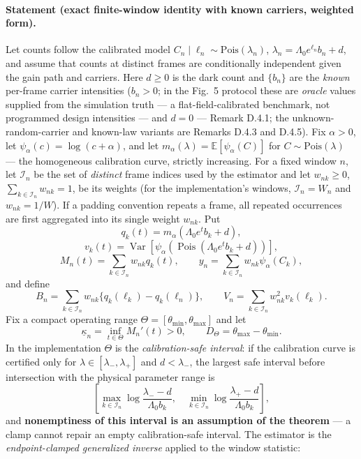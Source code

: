 \paragraph{Statement (exact finite-window identity with known carriers, weighted form).} Let counts follow the calibrated model $C_n\mid \ell_n\sim\mathrm{Pois}(\lambda_n)$, $\lambda_n=\Lambda_0e^{\ell_n}b_n+d$, and assume that counts at distinct frames are conditionally independent given the gain path and carriers. Here $d\ge0$ is the dark count and $\{b_n\}$ are the \emph{known} per-frame carrier intensities ($b_n>0$; in the Fig.~5 protocol these are \emph{oracle} values supplied from the simulation truth --- a flat-field-calibrated benchmark, not programmed design intensities --- and $d=0$ --- Remark D.4.1; the unknown-random-carrier and known-law variants are Remarks D.4.3 and D.4.5). Fix $\alpha>0$, let $\psi_\alpha(c)=\log(c+\alpha)$, and let $m_\alpha(\lambda)=\mathbb{E}[\psi_\alpha(C)]$ for $C\sim\mathrm{Pois}(\lambda)$ --- the homogeneous calibration curve, strictly increasing. For a fixed window $n$, let $\mathcal I_n$ be the set of \emph{distinct} frame indices used by the estimator and let $w_{nk}\ge0$, $\sum_{k\in\mathcal I_n}w_{nk}=1$, be its weights (for the implementation's windows, $\mathcal I_n=W_n$ and $w_{nk}=1/W$). If a padding convention repeats a frame, all repeated occurrences are first aggregated into its single weight $w_{nk}$. Put
\[
q_k(t)=m_\alpha(\Lambda_0e^t b_k+d),
\]
\[
v_k(t)=\operatorname{Var}\!\left[
\psi_\alpha(\operatorname{Pois}(\Lambda_0e^t b_k+d))\right],
\]
\[
M_n(t)=\sum_{k\in\mathcal I_n}w_{nk}q_k(t),
\qquad
y_n=\sum_{k\in\mathcal I_n}w_{nk}\psi_\alpha(C_k),
\]
and define
\[
B_n=\sum_{k\in\mathcal I_n}w_{nk}
\{q_k(\ell_k)-q_k(\ell_n)\},
\qquad
V_n=\sum_{k\in\mathcal I_n}w_{nk}^2v_k(\ell_k).
\]
Fix a compact operating range $\Theta=[\theta_{\min},\theta_{\max}]$ and let
\[
\underline\kappa_n=\inf_{t\in\Theta}M_n'(t)>0,
\qquad
D_\Theta=\theta_{\max}-\theta_{\min}.
\]
In the implementation $\Theta$ is the \emph{calibration-safe interval}: if the calibration curve is certified only for $\lambda\in[\lambda_-,\lambda_+]$ and $d<\lambda_-$, the largest safe interval before intersection with the physical parameter range is
\[
\left[
\max_{k\in\mathcal I_n}\log\frac{\lambda_--d}{\Lambda_0b_k},
\quad
\min_{k\in\mathcal I_n}\log\frac{\lambda_+-d}{\Lambda_0b_k}
\right],
\]
and \textbf{nonemptiness of this interval is an assumption of the theorem} --- a clamp cannot repair an empty calibration-safe interval. The estimator is the \emph{endpoint-clamped generalized inverse} applied to the window statistic:
